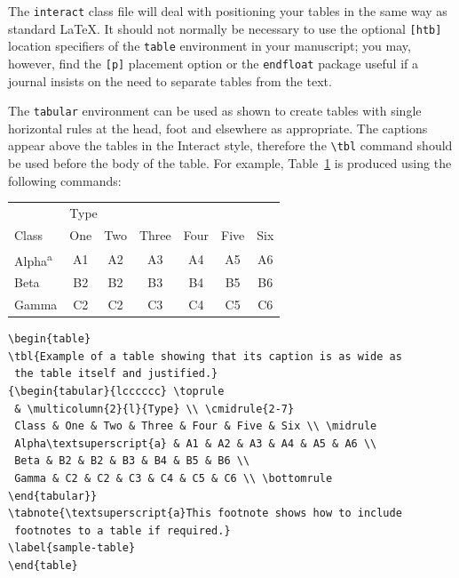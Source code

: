 \documentclass[]{interact}
\theoremstyle{plain}%
\theoremstyle{definition}
\theoremstyle{remark}
\begin{document}
The \texttt{interact} class file will deal with positioning your tables in the same way as standard \LaTeX. It should not normally be necessary to use the optional \texttt{[htb]} location specifiers of the \texttt{table} environment in your manuscript; you may, however, find the \verb"[p]" placement option or the \verb"endfloat" package useful if a journal insists on the need to separate tables from the text.

The \texttt{tabular} environment can be used as shown to create tables with single horizontal rules at the head, foot and elsewhere as appropriate. The captions appear above the tables in the \textsf{Interact} style, therefore the \verb"\tbl" command should be used before the body of the table. For example, Table~\ref{sample-table} is produced using the following commands:
\begin{table}
{\begin{tabular}{lcccccc} \toprule
 & \multicolumn{2}{l}{Type} \\ \cmidrule{2-7}
 Class & One & Two & Three & Four & Five & Six \\ \midrule
 Alpha\textsuperscript{a} & A1 & A2 & A3 & A4 & A5 & A6 \\
 Beta & B2 & B2 & B3 & B4 & B5 & B6 \\
 Gamma & C2 & C2 & C3 & C4 & C5 & C6 \\ \bottomrule
\end{tabular}}
\label{sample-table}
\end{table}
\begin{verbatim}
\begin{table}
\tbl{Example of a table showing that its caption is as wide as
 the table itself and justified.}
{\begin{tabular}{lcccccc} \toprule
 & \multicolumn{2}{l}{Type} \\ \cmidrule{2-7}
 Class & One & Two & Three & Four & Five & Six \\ \midrule
 Alpha\textsuperscript{a} & A1 & A2 & A3 & A4 & A5 & A6 \\
 Beta & B2 & B2 & B3 & B4 & B5 & B6 \\
 Gamma & C2 & C2 & C3 & C4 & C5 & C6 \\ \bottomrule
\end{tabular}}
\tabnote{\textsuperscript{a}This footnote shows how to include
 footnotes to a table if required.}
\label{sample-table}
\end{table}
\end{verbatim}
\end{document}
